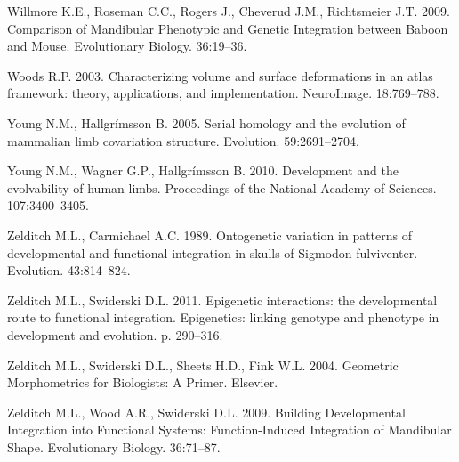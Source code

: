 \documentclass[12pt,]{article}
\begin{document}
Willmore K.E., Roseman C.C., Rogers J., Cheverud J.M., Richtsmeier J.T.
2009. Comparison of Mandibular Phenotypic and Genetic Integration
between Baboon and Mouse. Evolutionary Biology. 36:19--36.

Woods R.P. 2003. Characterizing volume and surface deformations in an
atlas framework: theory, applications, and implementation. NeuroImage.
18:769--788.

Young N.M., Hallgrímsson B. 2005. Serial homology and the evolution of
mammalian limb covariation structure. Evolution. 59:2691--2704.

Young N.M., Wagner G.P., Hallgrímsson B. 2010. Development and the
evolvability of human limbs. Proceedings of the National Academy of
Sciences. 107:3400--3405.

Zelditch M.L., Carmichael A.C. 1989. Ontogenetic variation in patterns
of developmental and functional integration in skulls of Sigmodon
fulviventer. Evolution. 43:814--824.

Zelditch M.L., Swiderski D.L. 2011. Epigenetic interactions: the
developmental route to functional integration. Epigenetics: linking
genotype and phenotype in development and evolution. p. 290--316.

Zelditch M.L., Swiderski D.L., Sheets H.D., Fink W.L. 2004. Geometric
Morphometrics for Biologists: A Primer. Elsevier.

Zelditch M.L., Wood A.R., Swiderski D.L. 2009. Building Developmental
Integration into Functional Systems: Function-Induced Integration of
Mandibular Shape. Evolutionary Biology. 36:71--87.
\end{document}
